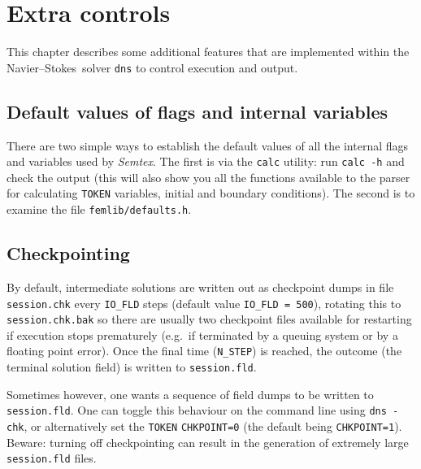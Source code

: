 \documentclass[11pt]{report}
\newcommand{\Semtex}{\emph{Semtex}} \newcommand{\Dog}{\emph{Dog}}
\newcommand{\eg}{e.g.\ } \newcommand{\CC}{\mathrm{c.c.}}
\newcommand\NavSto{Navier--Stokes}
\begin{document}
\chapter{Extra controls}
\label{ch.extra}

This chapter describes some additional features that are implemented
within the \NavSto\ solver \verb+dns+ to control execution and
output.

\section{Default values of flags and internal variables}
\label{sec.default}

There are two simple ways to establish the default values of all the
internal flags and variables used by \Semtex. The first is via
the \verb+calc+ utility: run \verb+calc -h+ and check the output (this
will also show you all the functions available to the parser for
calculating \verb+TOKEN+ variables, initial and boundary
conditions). The second is to examine the file
\verb+femlib/defaults.h+.

\section{Checkpointing}
\label{sec.check}

By default, intermediate solutions are written out as checkpoint dumps
in file \verb+session.chk+ every \verb+IO_FLD+ steps (default value
\verb+IO_FLD = 500+), rotating this to \verb+session.chk.bak+ so there
are usually two checkpoint files available for restarting if execution
stops prematurely (\eg if terminated by a queuing system or by a
floating point error).  Once the final time (\verb+N_STEP+) is
reached, the outcome (the terminal solution field) is written to
\verb+session.fld+.

Sometimes however, one wants a sequence of field dumps to be written
to \verb+session.fld+.  One can toggle this behaviour on the command
line using \verb+dns -chk+, or alternatively set the \verb+TOKEN+
\verb+CHKPOINT=0+ (the default being \verb+CHKPOINT=1+).  Beware:
turning off checkpointing can result in the generation of extremely
large \verb+session.fld+ files.

\end{document}
